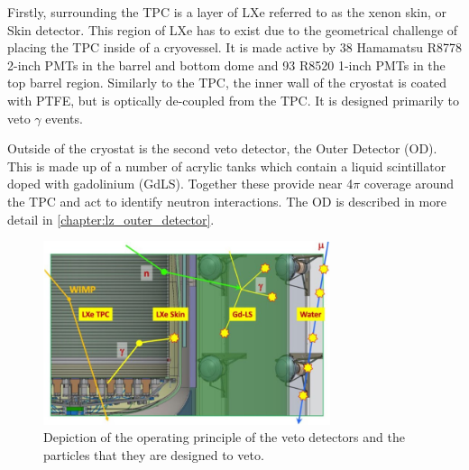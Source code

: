 \par
Firstly, surrounding the TPC is a layer of LXe referred to as the xenon skin, or Skin detector.
This region of LXe has to exist due to the geometrical challenge of placing the TPC inside of a cryovessel.
It is made active by 38 Hamamatsu R8778 2-inch PMTs in the barrel and bottom dome and 93 R8520 1-inch PMTs in the top barrel region.
Similarly to the TPC, the inner wall of the cryostat is coated with PTFE, but is optically de-coupled from the TPC.
It is designed primarily to veto $\gamma$ events.

\par
Outside of the cryostat is the second veto detector, the Outer Detector (OD).
This is made up of a number of acrylic tanks which contain a liquid scintillator doped with gadolinium (GdLS).
Together these provide near 4$\pi$ coverage around the TPC and act to identify neutron interactions.
The OD is described in more detail in \autoref{chapter:lz_outer_detector}.

\begin{figure}
    \centering
    \includegraphics[width=0.75\textwidth]{Figures/LZ/lz_veto_plan.png}
    \caption{Depiction of the operating principle of the veto detectors and the particles that they are designed to veto.}
    \label{fig:LZ_Veto_Principle}
\end{figure}


